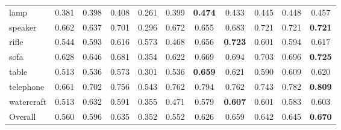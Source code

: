 \documentclass[twocolumn]{svjour3}
\begin{document}
\begin{table*}[!t]
{\begin{tabular}{lcccccccccc}
      lamp         & 0.381      & 0.398      & 0.408
                   & 0.261      & 0.399      & \bf{0.474}
                   & 0.433      & 0.445
                   & 0.448      & 0.457 \\
      speaker      & 0.662      & 0.637      & 0.701
                   & 0.296      & 0.672      & 0.655
                   & 0.683      & 0.721
                   & 0.721      & \bf{0.721} \\
      rifle        & 0.544      & 0.593      & 0.616
                   & 0.573      & 0.468      & 0.656
                   & \bf{0.723} & 0.601
                   & 0.594      & 0.617 \\
      sofa         & 0.628      & 0.646      & 0.681
                   & 0.354      & 0.622      & 0.669
                   & 0.694      & 0.703
                   & 0.696      & \bf{0.725} \\
      table        & 0.513      & 0.536      & 0.573
                   & 0.301      & 0.536      & \bf{0.659}
                   & 0.621      & 0.590
                   & 0.609      & 0.620 \\
      telephone    & 0.661      & 0.702      & 0.756
                   & 0.543      & 0.762      & 0.794
                   & 0.762      & 0.743
                   & 0.782      & \bf{0.809} \\
      watercraft   & 0.513      & 0.632      & 0.591
                   & 0.355      & 0.471      & 0.579
                   & \bf{0.607} & 0.601
                   & 0.583      & 0.603 \\
      \midrule
      Overall      & 0.560      & 0.596      & 0.635
                   & 0.352      & 0.552      & 0.626
                   & 0.659      & 0.642
                   & 0.645      & \bf{0.670} \\
      \bottomrule
    \end{tabular}
  }
  \label{tab:shapenet-voxel-reconstruction-iou}
\end{table*}
\end{document}
